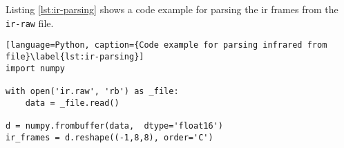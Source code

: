 Listing \ref{lst:ir-parsing} shows a code example for parsing the \gls{ir} frames from the \texttt{ir-raw} file.

\begin{lstlisting}[language=Python, caption={Code example for parsing infrared from file}\label{lst:ir-parsing}]
import numpy

with open('ir.raw', 'rb') as _file:
    data = _file.read()

d = numpy.frombuffer(data,  dtype='float16')
ir_frames = d.reshape((-1,8,8), order='C')
\end{lstlisting}